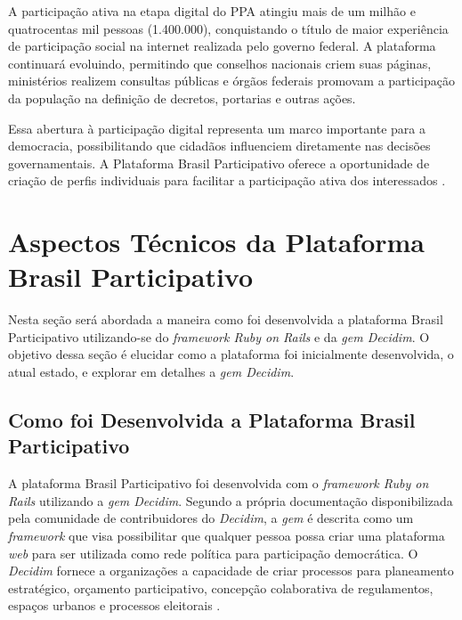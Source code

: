 A participação ativa na etapa digital do PPA atingiu mais de um milhão e quatrocentas mil pessoas (1.400.000), conquistando o título de maior experiência de participação social na internet realizada pelo governo federal. A plataforma continuará evoluindo, permitindo que conselhos nacionais criem suas páginas, ministérios realizem consultas públicas e órgãos federais promovam a participação da população na definição de decretos, portarias e outras ações.

Essa abertura à participação digital representa um marco importante para a democracia, possibilitando que cidadãos influenciem diretamente nas decisões governamentais. A Plataforma Brasil Participativo oferece a oportunidade de criação de perfis individuais para facilitar a participação ativa dos interessados \cite{brasilparticipativo-sobre}.

\section{Aspectos Técnicos da Plataforma Brasil Participativo}
\label{sec:aspectos_tecnicos_da_plataforma_brasil_participativo}

Nesta seção será abordada a maneira como foi desenvolvida a plataforma Brasil Participativo utilizando-se do \textit{framework Ruby on Rails} e da \textit{gem Decidim}. O objetivo dessa seção é elucidar como a plataforma foi inicialmente desenvolvida, o atual estado, e explorar em detalhes a \textit{gem Decidim}.

\subsection{Como foi Desenvolvida a Plataforma Brasil Participativo}

A plataforma Brasil Participativo foi desenvolvida com o \textit{framework Ruby on Rails} utilizando a \textit{gem Decidim}. Segundo a própria documentação disponibilizada pela comunidade de contribuidores do \textit{Decidim}, a \textit{gem} é descrita como um \textit{framework} que visa possibilitar que qualquer pessoa possa criar uma plataforma \textit{web} para ser utilizada como rede política para participação democrática. O \textit{Decidim} fornece a organizações a capacidade de criar processos para planeamento estratégico, orçamento participativo, concepção colaborativa de regulamentos, espaços urbanos e processos eleitorais \cite{decidim-about}.

